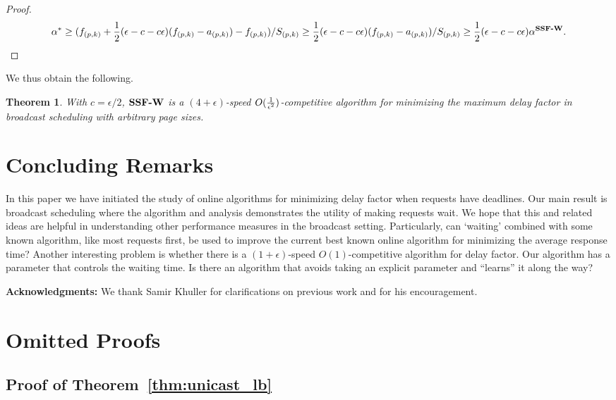 \documentclass[11pt]{article}
\newtheorem{theorem}[lemma]{Theorem}
\newcommand{\eps}{\epsilon}
\newcommand{\st}{S} \newcommand{\Algorithm}[1]{{\texttt{\bf{#1}}}} \newcommand{\sbg}{\Algorithm{SSF-W}} \newcommand{\sug}{\Algorithm{SSF}} \newcommand{\mmug}{\Algorithm{SSF-ID}}
\begin{document}
\begin{proof}
\[
  \alpha^*  \ge (f_{(p,k)} + {1 \over 2}(\eps - c - c\eps)(f_{(p,k)} - a_{(p,k)}) - f_{(p,k)})/\st_{(p,k)}  \ge  {1 \over 2}(\eps - c - c\eps) (f_{(p,k)} - a_{(p,k)})/\st_{(p,k)} \ge  {1 \over 2}(\eps - c - c\eps)\alpha^{\sbg}.
\]
\end{proof}

We thus obtain the following.


\begin{theorem}
  With $c = \eps/2$, $\sbg$ is a $(4+ \eps)$-speed $O({1 \over
    {\eps^2}})$-competitive algorithm for minimizing the maximum delay
  factor in broadcast scheduling with arbitrary page sizes.
\end{theorem}


\section{Concluding Remarks}
In this paper we have initiated the study of online algorithms for
minimizing delay factor when requests have deadlines.  Our main result
is broadcast scheduling where the algorithm and analysis demonstrates
the utility of making requests wait. We hope that this and related
ideas are helpful in understanding other performance measures in the
broadcast setting. Particularly, can `waiting' combined with some
known algorithm, like most requests first, be used to improve the
current best known online algorithm for minimizing the average
response time? Another interesting problem is whether there is a
$(1+\eps)$-speed $O(1)$-competitive algorithm for delay factor.  Our
algorithm has a parameter that controls the waiting time. Is there an
algorithm that avoids taking an explicit parameter and ``learns'' it
along the way?

\bigskip
\noindent
{\bf Acknowledgments:} We thank Samir Khuller for
clarifications on previous work and for his encouragement.





\appendix

\section{Omitted Proofs}

\subsection{Proof of Theorem~\ref{thm:unicast_lb}}
\end{document}
